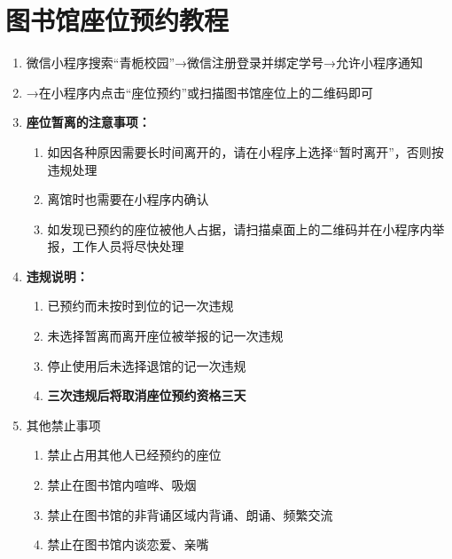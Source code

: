 \section[图书馆座位预约教程]{图书馆座位预约教程}
\label{library_book}
\begin{enumerate}
      \item 微信小程序搜索“青栀校园”→微信注册登录并绑定学号→允许小程序通知
      \item →在小程序内点击“座位预约”或扫描图书馆座位上的二维码即可
      \item \textbf{座位暂离的注意事项：}
            \begin{enumerate}
                  \item 如因各种原因需要长时间离开的，请在小程序上选择“暂时离开”，否则按违规处理
                  \item 离馆时也需要在小程序内确认
                  \item 如发现已预约的座位被他人占据，请扫描桌面上的二维码并在小程序内举报，工作人员将尽快处理
            \end{enumerate}
      \item \textbf{违规说明：}
            \begin{enumerate}
                  \item 已预约而未按时到位的记一次违规
                  \item 未选择暂离而离开座位被举报的记一次违规
                  \item 停止使用后未选择退馆的记一次违规
                  \item \textbf{三次违规后将取消座位预约资格三天}
            \end{enumerate}
      \item 其他禁止事项
            \begin{enumerate}
                  \item 禁止占用其他人已经预约的座位
                  \item 禁止在图书馆内喧哗、吸烟
                  \item 禁止在图书馆的非背诵区域内背诵、朗诵、频繁交流
                  \item 禁止在图书馆内谈恋爱、亲嘴
            \end{enumerate}
\end{enumerate}

